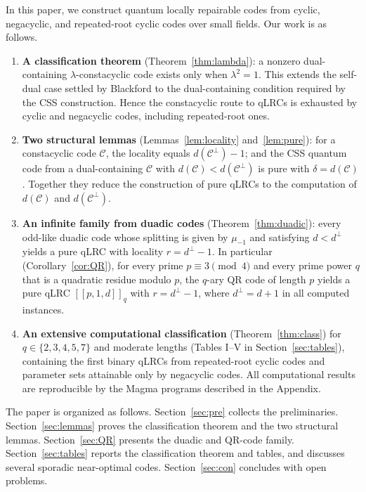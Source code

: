 \documentclass[journal,onecolumn]{IEEEtran}
\newcommand{\cc}{{\mathcal C}}
\newcommand{\dsb}[1]{[\![#1]\!]}
\begin{document}
In this paper, we construct quantum locally repairable codes from cyclic, negacyclic, and repeated-root cyclic codes over small fields. Our work is as follows.
\begin{enumerate}
\item \textbf{A classification theorem} (Theorem~\ref{thm:lambda}): a nonzero dual-containing $\lambda$-constacyclic code exists only when $\lambda^2=1$. This extends the self-dual case settled by Blackford \cite[Corollary~2]{Blackford2013} to the dual-containing condition required by the CSS construction. Hence the constacyclic route to qLRCs is exhausted by cyclic and negacyclic codes, including repeated-root ones.
\item \textbf{Two structural lemmas} (Lemmas~\ref{lem:locality} and~\ref{lem:pure}): for a constacyclic code $\cc$, the locality equals $d(\cc^{\perp})-1$; and the CSS quantum code from a dual-containing $\cc$ with $d(\cc)<d(\cc^\perp)$ is pure with $\delta=d(\cc)$. Together they reduce the construction of pure qLRCs to the computation of $d(\cc)$ and $d(\cc^\perp)$.
\item \textbf{An infinite family from duadic codes} (Theorem~\ref{thm:duadic}): every odd-like duadic code whose splitting is given by $\mu_{-1}$ and satisfying $d<d^\perp$ yields a pure qLRC with locality $r=d^\perp-1$. In particular (Corollary~\ref{cor:QR}), for every prime $p\equiv 3 \pmod 4$ and every prime power $q$ that is a quadratic residue modulo $p$, the $q$-ary QR code of length $p$ yields a pure qLRC $\dsb{p,1,d}_q$ with $r=d^\perp-1$, where $d^\perp=d+1$ in all computed instances.
\item \textbf{An extensive computational classification} (Theorem~\ref{thm:class}) for $q\in\{2,3,4,5,7\}$ and moderate lengths (Tables I--V in Section~\ref{sec:tables}), containing the first binary qLRCs from repeated-root cyclic codes and parameter sets attainable only by negacyclic codes. All computational results are reproducible by the Magma programs described in the Appendix.
\end{enumerate}

The paper is organized as follows. Section~\ref{sec:pre} collects the preliminaries. Section~\ref{sec:lemmas} proves the classification theorem and the two structural lemmas. Section~\ref{sec:QR} presents the duadic and QR-code family. Section~\ref{sec:tables} reports the classification theorem and tables, and discusses several sporadic near-optimal codes. Section~\ref{sec:con} concludes with open problems.
\end{document}
